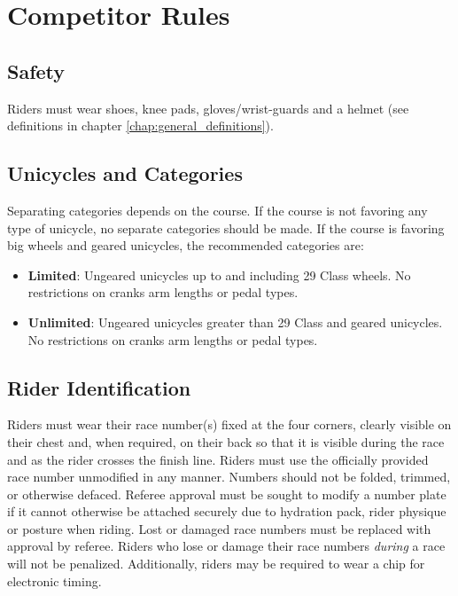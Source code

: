 \chapter{Competitor Rules}

\section{Safety}
Riders must wear shoes, knee pads, gloves/wrist-guards and a helmet (see definitions in chapter \ref{chap:general_definitions}).

\section{Unicycles and Categories}

Separating categories depends on the course.
If the course is not favoring any type of unicycle, no separate categories should be made.
If the course is favoring big wheels and geared unicycles, the recommended categories are:
\begin{itemize}
\item \textbf{Limited}: Ungeared unicycles up to and including 29 Class wheels. No restrictions on cranks arm lengths or pedal types.

\item \textbf{Unlimited}: Ungeared unicycles greater than 29 Class and geared unicycles. No restrictions on cranks arm lengths or pedal types.
\end{itemize}

\section{Rider Identification}

Riders must wear their race number(s) fixed at the four corners, clearly visible on their chest and, when required, on their back so that it is visible during the race and as the rider crosses the finish line.
Riders must use the officially provided race number unmodified in any manner.
Numbers should not be folded, trimmed, or otherwise defaced.
Referee approval must be sought to modify a number plate if it cannot otherwise be attached securely due to hydration pack, rider physique or posture when riding.
Lost or damaged race numbers must be replaced with approval by referee.
Riders who lose or damage their race numbers \textit{during} a race will not be penalized.
Additionally, riders may be required to wear a chip for electronic timing.

